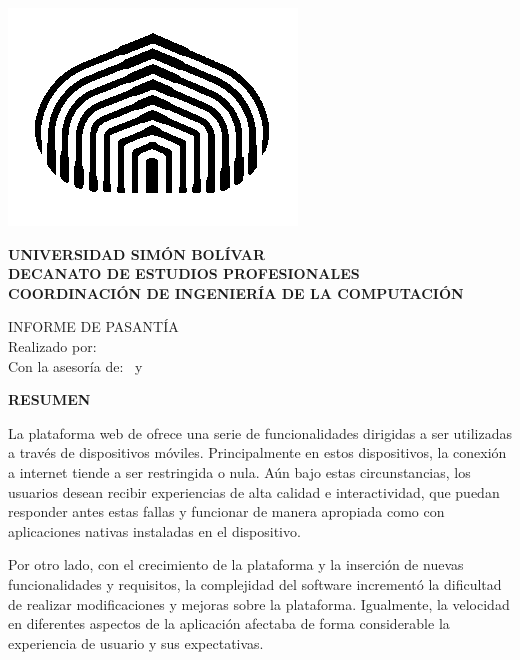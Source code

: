 
\setcounter{page}{4}

{
\renewcommand{\baselinestretch}{1.0}

\begin{center}
\includegraphics[scale=0.5,type=png,ext=.png,read=.png]{figures/usb-logo}

{
  \scshape
  \bfseries
  UNIVERSIDAD SIMÓN BOLÍVAR \\
  DECANATO DE ESTUDIOS PROFESIONALES \\
  COORDINACIÓN DE INGENIERÍA DE LA COMPUTACIÓN

  \bigskip

  \projecttitle
}

INFORME DE PASANTÍA \\
Realizado por: \projectauthor \\
Con la asesoría de: \academictutor\ y \industrialtutor

\bigskip

\textsc{\bfseries\uppercase{Resumen}}

\end{center}

La plataforma web de \business ofrece una serie de funcionalidades dirigidas a ser utilizadas a través de dispositivos móviles. Principalmente en estos dispositivos, la conexión a internet tiende a ser restringida o nula. Aún bajo estas circunstancias, los usuarios desean recibir experiencias de alta calidad e interactividad, que puedan responder antes estas fallas y funcionar de manera apropiada como con aplicaciones nativas instaladas en el dispositivo.

Por otro lado, con el crecimiento de la plataforma y la inserción de nuevas funcionalidades y requisitos, la complejidad del software incrementó la dificultad de realizar modificaciones y mejoras sobre la plataforma. Igualmente, la velocidad en diferentes aspectos de la aplicación afectaba de forma considerable la experiencia de usuario y sus expectativas.

}
